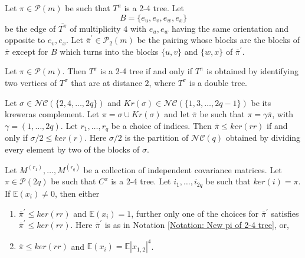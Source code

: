 \documentclass[10pt,a4paper]{amsart}
\newcommand{\E}{\mathbb{E}}
\newcommand{\NC}{\mathcal{NC}}
\newcommand{\cP}{\mathcal{P}}
\begin{document}
\begin{notation}\label{Notation: New pi of 2-4 tree}
Let $\pi\in \cP(m)$ be such that $T^\pi$ is a 2-4 tree. Let 
$$B=\{e_u,e_v,e_w,e_x\}$$ 
be the edge of $\overline{T^\pi}$ of multiplicity $4$ with $e_u,e_w$ having the same orientation and opposite to $e_v,e_x$. Let $\overline{\pi}^\prime\in \cP_2(m)$ be the pairing whose blocks are the blocks of $\overline{\pi}$ except for $B$ which turns into the blocks $\{u,v\}$ and $\{w,x\}$ of $\overline{\pi}^\prime$.
\end{notation}

\begin{lemma}\label{Lemma: Characterization of 2-4 tree}
Let $\pi\in \cP(m)$. Then $T^\pi$ is a 2-4 tree if and only if $T^\pi$ is obtained by identifying two vertices of $T^\sigma$ that are at distance $2$, where $T^\sigma$ is a double tree.
\end{lemma}

\begin{proposition}\label{Proposition: Equivalence of ker(r) and Ker(rr)}
Let $\sigma\in \NC(\{2,4,\dots,2q\})$ and $Kr(\sigma)\in \NC(\{1,3,\dots,2q-1\})$ be its kreweras complement. Let $\pi=\sigma\cup Kr(\sigma)$ and let $\overline{\pi}$ be such that $\pi=\gamma\overline{\pi}$, with $\gamma=(1,\dots,2q)$. Let $r_1,\dots,r_q$ be a choice of indices. Then $\overline{\pi}\leq ker(rr)$ if and only if $\sigma/2 \leq ker(r)$. Here $\sigma/2$ is the partition of $\NC(q)$ obtained by dividing every element by two of the blocks of $\sigma$.
\end{proposition}

\begin{proposition}\label{Proposition: contribution of 2-4 tree}
Let $M^{(r_1)},\dots, M^{(r_q)}$ be a collection of independent covariance matrices. Let $\pi\in \cP(2q)$ be such that $C^\pi$ is a 2-4 tree. Let $i_1,\dots,i_{2q}$ be such that $ker(i)=\pi$. If $\E(x_i)\neq 0$, then either
\begin{enumerate}
    \item $\overline{\pi}^\prime \leq ker(rr)$ and $\E(x_i)=1$, further only one of the choices for $\overline{\pi}^\prime$ satisfies $\overline{\pi}^\prime \leq ker(rr)$. Here $\overline{\pi}^\prime$ is as in Notation \ref{Notation: New pi of 2-4 tree}, or,
    \item $\overline{\pi}\leq ker(rr)$ and $\E(x_i)=\E|x_{1,2}|^4$. 
\end{enumerate}
\end{proposition}
\end{document}
